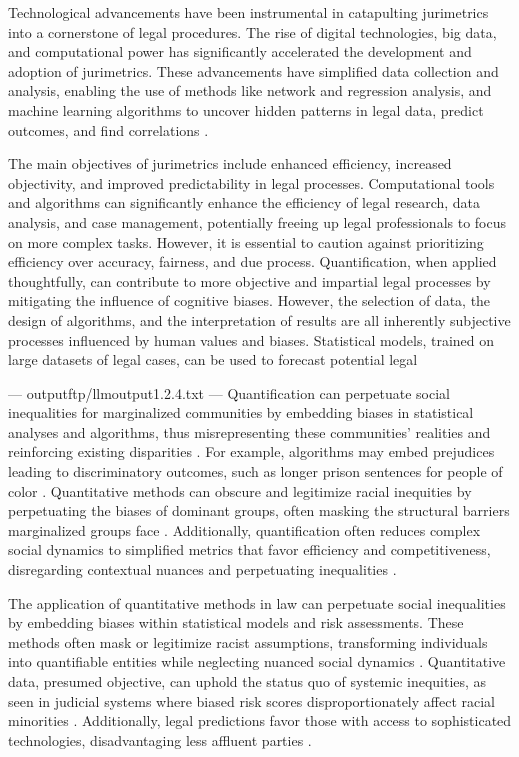 Technological advancements have been instrumental in catapulting jurimetrics into a cornerstone of legal procedures. The rise of digital technologies, big data, and computational power has significantly accelerated the development and adoption of jurimetrics. These advancements have simplified data collection and analysis, enabling the use of methods like network and regression analysis, and machine learning algorithms to uncover hidden patterns in legal data, predict outcomes, and find correlations \cite{10.1007/s11186-021-09453-1,unger2021process}.

The main objectives of jurimetrics include enhanced efficiency, increased objectivity, and improved predictability in legal processes. Computational tools and algorithms can significantly enhance the efficiency of legal research, data analysis, and case management, potentially freeing up legal professionals to focus on more complex tasks. However, it is essential to caution against prioritizing efficiency over accuracy, fairness, and due process. Quantification, when applied thoughtfully, can contribute to more objective and impartial legal processes by mitigating the influence of cognitive biases. However, the selection of data, the design of algorithms, and the interpretation of results are all inherently subjective processes influenced by human values and biases. Statistical models, trained on large datasets of legal cases, can be used to forecast potential legal


---
outputftp/llmoutput1.2.4.txt
---
Quantification can perpetuate social inequalities for marginalized communities by embedding biases in statistical analyses and algorithms, thus misrepresenting these communities' realities and reinforcing existing disparities \cite{saltelli2020}. For example, algorithms may embed prejudices leading to discriminatory outcomes, such as longer prison sentences for people of color \cite{saltelli2020}. Quantitative methods can obscure and legitimize racial inequities by perpetuating the biases of dominant groups, often masking the structural barriers marginalized groups face \cite{gillborn2017, gillborn2017}. Additionally, quantification often reduces complex social dynamics to simplified metrics that favor efficiency and competitiveness, disregarding contextual nuances and perpetuating inequalities \cite{camargo2022, di2023}.

The application of quantitative methods in law can perpetuate social inequalities by embedding biases within statistical models and risk assessments. These methods often mask or legitimize racist assumptions, transforming individuals into quantifiable entities while neglecting nuanced social dynamics \cite{gillborn2017, gillborn2017, gillborn2017}. Quantitative data, presumed objective, can uphold the status quo of systemic inequities, as seen in judicial systems where biased risk scores disproportionately affect racial minorities \cite{saltelli2020, lynch2019}. Additionally, legal predictions favor those with access to sophisticated technologies, disadvantaging less affluent parties \cite{ribeiro2021, ribeiro2021}.

